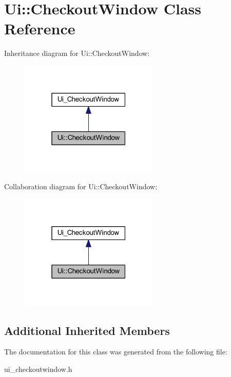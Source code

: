 \hypertarget{class_ui_1_1_checkout_window}{}\section{Ui\+:\+:Checkout\+Window Class Reference}
\label{class_ui_1_1_checkout_window}


Inheritance diagram for Ui\+:\+:Checkout\+Window\+:
\nopagebreak
\begin{figure}[H]
\begin{center}
\leavevmode
\includegraphics[width=187pt]{class_ui_1_1_checkout_window__inherit__graph}
\end{center}
\end{figure}


Collaboration diagram for Ui\+:\+:Checkout\+Window\+:
\nopagebreak
\begin{figure}[H]
\begin{center}
\leavevmode
\includegraphics[width=187pt]{class_ui_1_1_checkout_window__coll__graph}
\end{center}
\end{figure}
\subsection*{Additional Inherited Members}


The documentation for this class was generated from the following file\+:\begin{DoxyCompactItemize}
\item 
ui\+\_\+checkoutwindow.\+h\end{DoxyCompactItemize}

